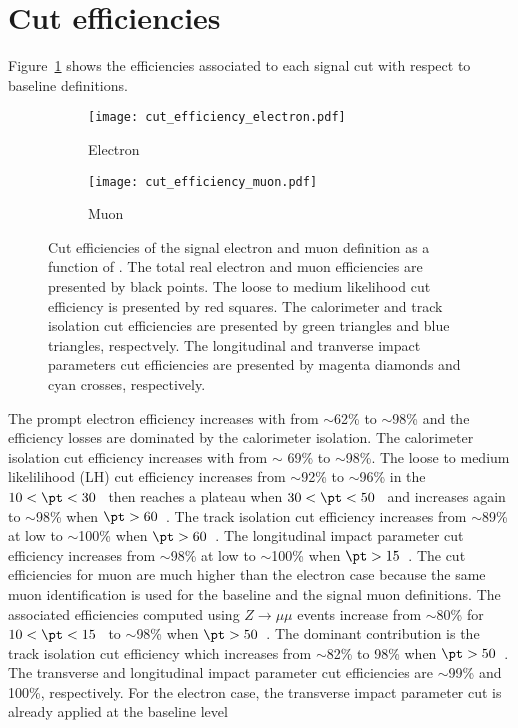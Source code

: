 \section{Cut efficiencies}
\label{sec:app_RLE_cut_efficiencies}
Figure~\ref{fig:app_RLE_cut_efficiencies} shows the efficiencies associated to each signal cut with respect to baseline definitions.
%
\begin{figure}[htbp]
    \begin{subfigure}[b]{0.48\textwidth}
        \begin{center}
            \texttt{[image: cut\_efficiency\_electron.pdf]}
            \caption{Electron}
        \end{center}
    \end{subfigure}
    \begin{subfigure}[b]{0.48\textwidth}
        \begin{center}
            \texttt{[image: cut\_efficiency\_muon.pdf]}
            \caption{Muon}
        \end{center}
    \end{subfigure}
    \caption{Cut efficiencies of the signal electron and muon definition as a function of \pt.
    The total real electron and muon efficiencies are presented by black points. 
    The loose to medium likelihood cut efficiency is presented by red squares.
    The calorimeter and track isolation cut efficiencies are presented by green triangles and blue triangles, respectvely.
    The longitudinal and tranverse impact parameters cut efficiencies are presented by magenta diamonds and cyan crosses, respectively.}
    \label{fig:app_RLE_cut_efficiencies}
\end{figure}
%
The prompt electron efficiency increases with \pt from $\sim$62\% to $\sim$98\% and the efficiency losses are dominated by the calorimeter isolation.
The calorimeter isolation cut efficiency increases with \pt from $\sim$ 69\% to $\sim$98\%.
The loose to medium likelilihood (LH) cut efficiency increases from $\sim$92\% to $\sim$96\% in the $10< \pt < 30$~{\GeV} then reaches a plateau when $30 < \pt < 50$~{\GeV} and increases again to $\sim$98\% when $\pt > 60$~{\GeV}.
The track isolation cut efficiency increases from $\sim$89\% at low \pt to $\sim$100\% when $\pt > 60$~{\GeV}.
The longitudinal impact parameter cut efficiency increases from $\sim$98\% at low \pt to $\sim$100\% when $\pt > 15$~{\GeV}.
The cut efficiencies for muon are much higher than the electron case because the same muon identification is used for the baseline and the signal muon definitions.
The associated efficiencies computed using $Z\to \mu \mu$ events increase from $\sim$80\% for $10 < \pt < 15$~{\GeV} to $\sim$98\% when $\pt > 50$~{\GeV}.
The dominant contribution is the track isolation cut efficiency which increases from $\sim$82\% to 98\% when $\pt > 50$~{\GeV}.
The transverse and longitudinal impact parameter cut efficiencies are $\sim$99\% and 100\%, respectively.
For the electron case, the transverse impact parameter cut is already applied at the baseline level

